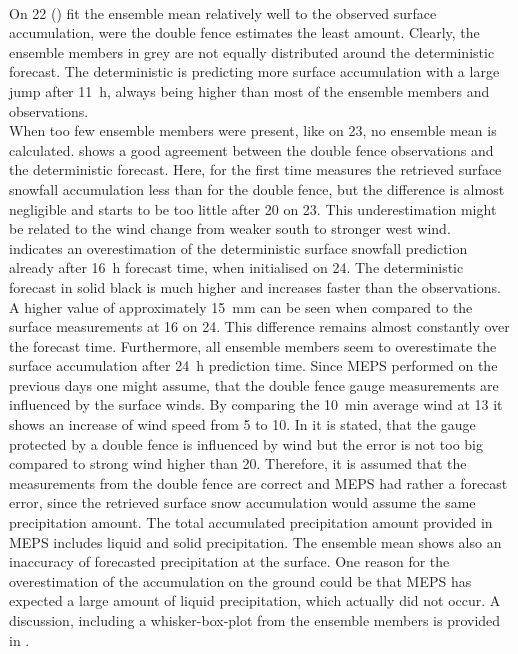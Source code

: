 \\
On \SI{22}{\dec} () fit the ensemble mean relatively well to the observed surface accumulation, were the double fence estimates the least amount. Clearly, the ensemble members in grey are not equally distributed around the deterministic forecast. The deterministic is predicting more surface accumulation with a large jump after \SI{11}{\hour}, always being higher than most of the ensemble members and observations. 
\\
When too few ensemble members were present, like on \SI{23}{\dec}, no ensemble mean is calculated.  shows a good agreement between the double fence observations and the deterministic forecast. Here, for the first time measures the retrieved surface snowfall accumulation less than for the double fence, but the difference is almost negligible and starts to be too little after \SI{20}{\UTC} on \SI{23}{\dec}. This underestimation might be related to the wind change from weaker south to stronger west wind.
\\
 indicates an overestimation of the deterministic surface snowfall prediction already after \SI{16}{\hour} forecast time, when initialised on \SI{24}{\dec}. The deterministic forecast in solid black is much higher and increases faster than the observations. A higher value of approximately \SI{15}{\mm} can be seen when compared to the surface measurements at \SI{16}{\UTC} on \SI{24}{\dec}. This difference remains almost constantly over the forecast time. Furthermore, all ensemble members seem to overestimate the surface accumulation after \SI{24}{\hour} prediction time. Since MEPS performed on the previous days one might assume, that the double fence gauge measurements are influenced by the surface winds. By comparing the \SI{10}{\minute} average wind at \SI{13}{\UTC} it shows an increase of wind speed from \SI{5}{\mPs} to \SI{10}{\mPs}. In \cite[][unpublished]{wolff_wmo_2018} it is stated, that the gauge protected by a double fence is influenced by wind but the error is not too big compared to strong wind higher than \SI{20}{\mPs}. Therefore, it is assumed that the measurements from the double fence are correct and MEPS had rather a forecast error, since the retrieved surface snow accumulation would assume the same precipitation amount. The total accumulated precipitation amount provided in MEPS includes liquid and solid precipitation. The ensemble mean shows also an inaccuracy of forecasted precipitation at the surface. One reason for the overestimation of the accumulation on the ground could be that MEPS has expected a large amount of liquid precipitation, which actually did not occur. A discussion, including a whisker-box-plot from the ensemble members is provided in .
